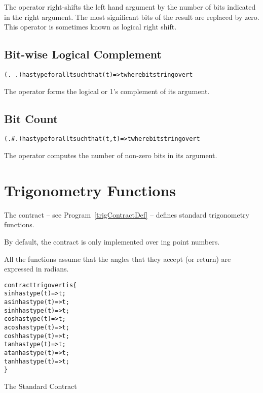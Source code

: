 The  operator right-shifts the left hand argument by the number of bits indicated in the right argument. The most significant bits of the result are replaced by zero. This operator is sometimes known as logical right shift.

\subsection{\q{.\~\xspace.} Bit-wise Logical Complement}
\label{bitComplement}
\begin{alltt}
(.~.) has type for all t such that (t)=>t where bitstring over t
\end{alltt}

The  operator forms the logical or 1's complement of its argument.

\subsection{ Bit Count}
\label{bitCount}
\begin{alltt}
(.#.) has type for all t such that (t,t)=>t where bitstring over t
\end{alltt}

The  operator computes the number of non-zero bits in its argument.


\section{Trigonometry Functions}
\label{trigContract}
The  contract -- see Program~\vref{trigContractDef} -- defines standard trigonometry functions.

\begin{aside}
By default, the  contract is only implemented over ing point numbers.
\end{aside}

\begin{aside}
All the  functions assume that the angles that they accept (or return) are expressed in radians.
\end{aside}

\begin{program}
\begin{alltt}
contract trig over t is \{
  sin has type (t)=>t;
  asin has type (t)=>t;
  sinh has type (t)=>t;
  cos has type (t)=>t;
  acos has type (t)=>t;
  cosh has type (t)=>t;
  tan has type (t)=>t;
  atan has type (t)=>t;
  tanh has type (t)=>t;
\}
\end{alltt}
\caption{The Standard  Contract\label{trigContractDef}}
\end{program}

